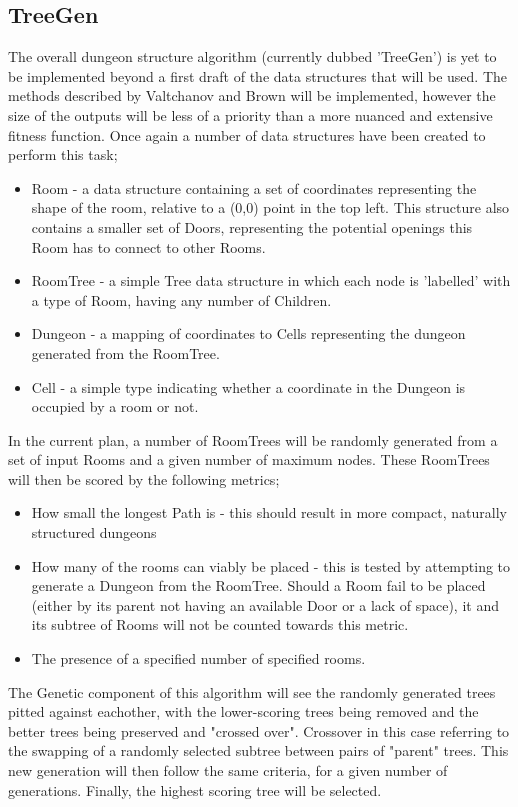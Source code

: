 \documentclass{article}
\begin{document}
\subsection{TreeGen}
The overall dungeon structure algorithm (currently dubbed 'TreeGen') is yet to be implemented beyond a first draft of the data structures that will be used. The methods described by Valtchanov and Brown\cite{genetic} will be implemented, however the size of the outputs will be less of a priority than a more nuanced and extensive fitness function. Once again a number of data structures have been created to perform this task;
\begin{itemize}
    \item Room - a data structure containing a set of coordinates representing the shape of the room, relative to a (0,0) point in the top left. This structure also contains a smaller set of Doors, representing the potential openings this Room has to connect to other Rooms.
    \item RoomTree - a simple Tree data structure in which each node is 'labelled' with a type of Room, having any number of Children.
    \item Dungeon - a mapping of coordinates to Cells representing the dungeon generated from the RoomTree.
    \item Cell - a simple type indicating whether a coordinate in the Dungeon is occupied by a room or not.
\end{itemize}



In the current plan, a number of RoomTrees will be randomly generated from a set of input Rooms and a given number of maximum nodes. These RoomTrees will then be scored by the following metrics; \begin{itemize}
    \item How small the longest Path is - this should result in more compact, naturally structured dungeons
    \item How many of the rooms can viably be placed - this is tested by attempting to generate a Dungeon from the RoomTree. Should a Room fail to be placed (either by its parent not having an available Door or a lack of space), it and its subtree of Rooms will not be counted towards this metric. 
    \item The presence of a specified number of specified rooms.
\end{itemize}
The Genetic component of this algorithm will see the randomly generated trees pitted against eachother, with the lower-scoring trees being removed and the better trees being preserved and "crossed over". Crossover in this case referring to the swapping of a randomly selected subtree between pairs of "parent" trees. This new generation will then follow the same criteria, for a given number of generations. Finally, the highest scoring tree will be selected.
\end{document}
